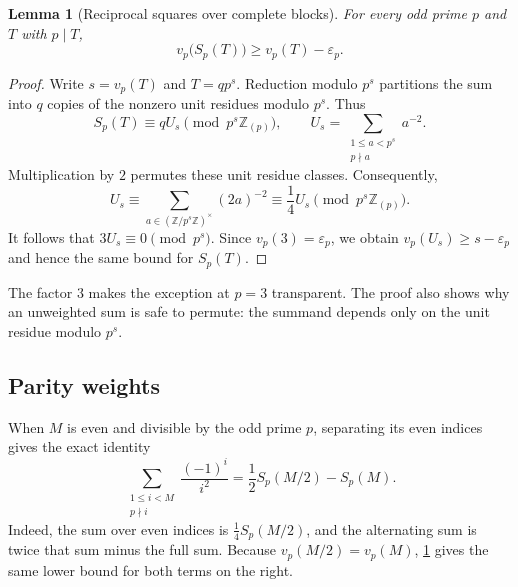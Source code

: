 \documentclass[11pt,a4paper]{article}
\numberwithin{equation}{section}
\newtheorem{lemma}[lemma]{Lemma}
\theoremstyle{definition}
\theoremstyle{remark}
\newcommand{\Z}{\mathbb Z}
\newcommand{\Zp}{\Z_{(p)}}
\newcommand{\vp}{v_p}
\newcommand{\epsp}{\varepsilon_p}
\newcommand{\Sp}{S_p}
\newcommand{\pmodring}[1]{\pmod{#1\Zp}}
\begin{document}
\begin{lemma}[Reciprocal squares over complete blocks]\label{lem:squares}
For every odd prime $p$ and $T$ with $p\mid T$,
\begin{equation}\label{eq:S-bound}
 \vp\bigl(\Sp(T)\bigr)\geq\vp(T)-\epsp.
\end{equation}
\end{lemma}
\begin{proof}
Write $s=\vp(T)$ and $T=q p^s$. Reduction modulo $p^s$ partitions the
sum into $q$ copies of the nonzero unit residues modulo $p^s$. Thus
\[
 \Sp(T)\equiv q U_s\pmodring{p^s},\qquad
 U_s=\sum_{\substack{1\leq a<p^s\\p\nmid a}}a^{-2}.
\]
Multiplication by $2$ permutes these unit residue classes. Consequently,
\[
 U_s\equiv\sum_{a\in(\Z/p^s\Z)^\times}(2a)^{-2}
     \equiv\frac14U_s\pmodring{p^s}.
\]
It follows that $3U_s\equiv0\pmod{p^s}$. Since
$\vp(3)=\epsp$, we obtain $\vp(U_s)\geq s-\epsp$ and hence the same
bound for $\Sp(T)$.
\end{proof}

The factor $3$ makes the exception at $p=3$ transparent. The proof also
shows why an unweighted sum is safe to permute: the summand depends
only on the unit residue modulo $p^s$.

\subsection{Parity weights}

When $M$ is even and divisible by the odd prime $p$, separating its even
indices gives the exact identity
\begin{equation}\label{eq:alternating}
 \sum_{\substack{1\leq i<M\\p\nmid i}}\frac{(-1)^i}{i^2}
 =\frac12\Sp(M/2)-\Sp(M).
\end{equation}
Indeed, the sum over even indices is $\tfrac14\Sp(M/2)$, and the
alternating sum is twice that sum minus the full sum. Because
$\vp(M/2)=\vp(M)$, \cref{lem:squares} gives the same lower bound for
both terms on the right.
\end{document}
